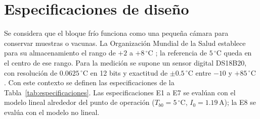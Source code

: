 \section{Especificaciones de diseño}\label{sec:especificaciones}
Se considera que el bloque frío funciona como una pequeña cámara para conservar muestras o vacunas. La Organización Mundial de la Salud establece para su almacenamiento el rango de $+2$ a $+8\,^\circ\mathrm C$ \cite{who_pqs}; la referencia de $5\,^\circ\mathrm C$ queda en el centro de ese rango. Para la medición se supone un sensor digital DS18B20, con resolución de $0.0625\,^\circ\mathrm C$ en 12 bits y exactitud de $\pm0.5\,^\circ\mathrm C$ entre $-10$ y $+85\,^\circ\mathrm C$ \cite{ds18b20}. Con este contexto se definen las especificaciones de la Tabla~\ref{tab:especificaciones}. Las especificaciones E1 a E7 se evalúan con el modelo lineal alrededor del punto de operación ($T_{b0}=5\,^\circ\mathrm C$, $I_0=1.19\,\mathrm A$); la E8 se evalúa con el modelo no lineal.

